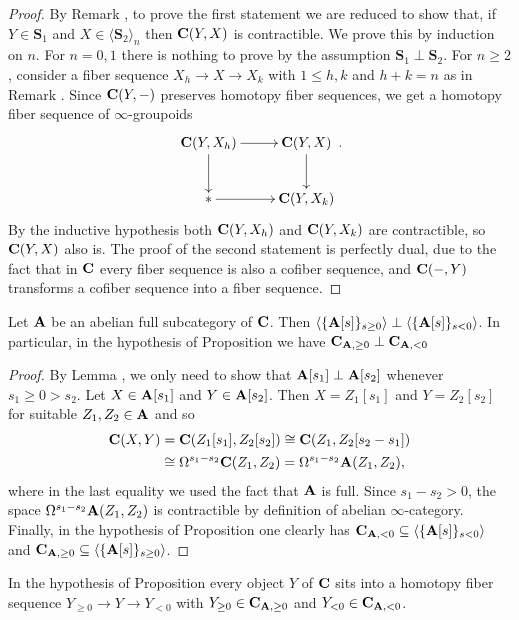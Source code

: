 \begin{proof}
By Remark , to prove the first statement we are reduced to show that, if $Y\in \mathbf{S}_1$ and $X\in \langle\mathbf{S}_2\rangle_n$ then $\textbf{C}(Y,X)$ is contractible. We prove this by induction on $n$. For $n=0,1$ there is nothing to prove by the assumption $\mathbf{S}_1\perp \mathbf{S}_2$. For $n\geq 2$, consider a fiber sequence $X_h\to X\to X_k$ with $1\leq h,k$ and $h+k=n$ as in Remark . Since $\textbf{C}(Y,-)$ preserves homotopy fiber sequences, we get a homotopy fiber sequence of $\infty$-groupoids
\[
\xymatrix{
\CC(Y,X_h)\ar[r]\ar[d]& \CC(Y,X)\ar[d]\\
{*}\ar[r] &\CC(Y,X_k)
}.
\]
By the inductive hypothesis both $\textbf{C}(Y,X_h)$ and $\textbf{C}(Y,X_k)$ are contractible, so $\textbf{C}(Y,X)$ also is. The proof of the second statement is perfectly dual, due to the fact that in $\textbf{C}$ every fiber sequence is also a cofiber sequence, and $\textbf{C}(-,Y)$ transforms a cofiber sequence into a fiber sequence.
\end{proof}
\begin{lemma}\label{uno}
Let $\textbf{A}$ be an abelian full subcategory of $\textbf{C}$. Then $\langle \{\textbf{A}[s]\}_{s\geq 0}\rangle\perp \langle \{\textbf{A}[s]\}_{s<0}\rangle$. In particular, in the hypothesis of Proposition  we have $\textbf{C}_{\textbf{A},\geq 0}\perp \textbf{C}_{\textbf{A},<0}$
\end{lemma}
\begin{proof}
By Lemma , we only need to show that $\textbf{A}[s_1]\perp \textbf{A}[s_2]$ whenever $s_1\geq 0> s_2$. Let $X\in \textbf{A}[s_1]$ and $Y\in\textbf{A}[s_2]$. Then $X=Z_1[s_1]$ and $Y=Z_2[s_2]$ for suitable $Z_1,Z_2\in \textbf{A}$ and so 
\begin{align*}
\textbf{C}(X,Y)&=\textbf{C}(Z_1[s_1],Z_2[s_2])\cong  \textbf{C}(Z_1,Z_2[s_2-s_1])\\
&\cong \Omega^{s_1-s_2}\textbf{C}(Z_1,Z_2)=\Omega^{s_1-s_2}\textbf{A}(Z_1,Z_2),
\end{align*}
where in the last equality we used the fact that $\textbf{A}$ is full. Since $s_1-s_2>0$, the space $\Omega^{s_1-s_2}\textbf{A}(Z_1,Z_2)$ is contractible by definition of abelian $\infty$-category.
Finally, in the hypothesis of Proposition   one clearly has $\textbf{C}_{\textbf{A},< 0}\subseteq \langle \{\textbf{A}[s]\}_{s<0}\rangle$ and $\textbf{C}_{\textbf{A},\geq 0}\subseteq \langle \{\textbf{A}[s]\}_{s\geq 0}\rangle$.
\end{proof}
\begin{lemma}\label{due}
In the hypothesis of Proposition  every object $Y$ of $\textbf{C}$ sits into a homotopy fiber sequence $Y_{\geq 0}\to Y\to Y_{<0}$ with $Y_{\geq 0}\in \textbf{C}_{\textbf{A},\geq 0}$ and $Y_{< 0}\in \textbf{C}_{\textbf{A},< 0}$.
\end{lemma}
